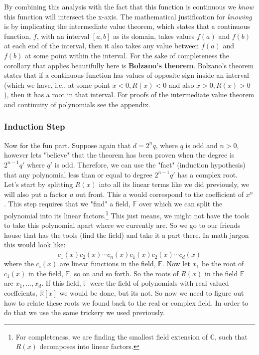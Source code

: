 \documentclass[12pt]{article}
\begin{document}
  By combining this analysis with the fact that this function is continuous we \emph{know} this function will intersect the x-axis.  The mathematical justification for \emph{knowing} is by implicating the intermediate value theorem, which states that a continuous function, $f$, with an interval $[a,b]$ as its domain, takes values $f(a)$ and $f(b)$ at each end of the interval, then it also takes any value between $f(a)$ and $f(b)$ at some point within the interval.  For the sake of completeness the corollary that applies beautifully here is \textbf{Bolzano's theorem}.  Bolzano's theorem states that if a continuous function has values of opposite sign inside an interval (which we have, i.e., at some point $x<0, R(x)<0$ and also $x>0, R(x)>0$), then it has a root in that interval.  For proofs of the intermediate value theorem and continuity of polynomials see the appendix.

\subsubsection*{Induction Step}
Now for the fun part.  Suppose again that $d=2^n q$, where $q$ is odd and $n>0$, however lets "believe" that the theorem has been proven when the degree is $2^{n-1}q'$ where $q'$ is odd.  Therefore, we can use the "fact" (induction hypothesis) that any polynomial less than or equal to degree $2^{n-1} q'$ has a complex root.\\

Let's start by splitting $R(x)$ into all its linear terms like we did previously, we will also put a factor $a$ out front.  This $a$ would correspond to the coefficient of $x^n$.  This step requires that we "find" a field, $\mathbb{F}$ over which we can split the polynomial into its linear factors.\footnote{For completeness, we are finding the smallest field extension of $\mathbb{C}$, such that $R(x)$ decomposes into linear factors.}  This just means, we might not have the tools to take this polynomial apart where we currently are.  So we go to our friends house that has the tools (find the field) and take it a part there.  In math jargon this would look like: \\
$$c_1(x)c_2(x)\cdots c_n(x)\bar{c_1(x)}\bar{c_2(x)}\cdots \bar{c_d(x)}$$ where the $c_i(x)$ are linear functions in the field, $\mathbb{F}$.  Now let $x_1$ be the root of $c_1(x)$ in the field, $\mathbb{F}$, so on and so forth.  So the roots of $R(x)$ in the field $\mathbb{F}$ are $x_1, \ldots, x_d$.  If this field, $\mathbb{F}$ were the field of polynomials with real valued coeffcients, $\mathbb{R}[x]$ we would be done, but its not.  So now we need to figure out how to relate these roots we found back to the real or complex field.  In order to do that we use the same trickery we used previously.\\
\end{document}
